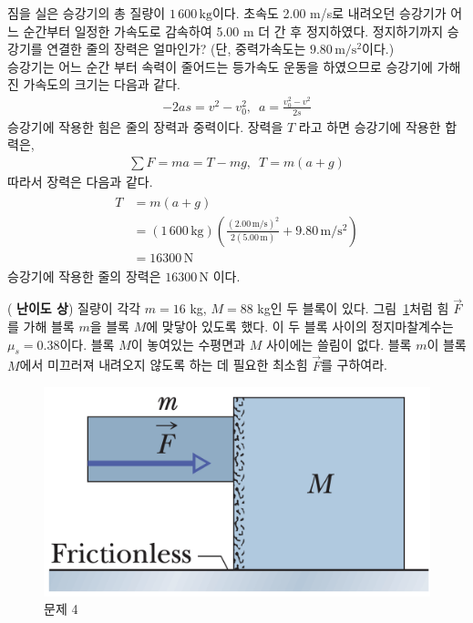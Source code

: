 \documentclass[floatfix,nofootinbib,superscriptaddress,fleqn,preprint]{revtex4}
\begin{document}
짐을 실은 승강기의 총 질량이 
$1\,600\,\mathrm{kg}$이다. 초속도 2.00 m/s로 내려오던 승강기가 어느
순간부터 일정한 가속도로 감속하여 5.00 m 더 간 후
정지하였다. 정지하기까지 승강기를 연결한 줄의 장력은 얼마인가? (단,
중력가속도는 $9.80\,\mathrm{m/s^2}$이다.)   \\

승강기는 어느 순간 부터 속력이 줄어드는 등가속도 운동을 하였으므로
 승강기에 가해진 가속도의 크기는 다음과 같다.
\begin{align}
  -2as = v^2-v_0^2,\,\,\, a = \frac{v_0^2-v^2}{2s}
\end{align}
승강기에 작용한 힘은 줄의 장력과 중력이다. 장력을 $T$ 라고 하면
 승강기에 작용한 합력은,
\begin{align}
  \sum F = ma = T-mg,\,\,\, T = m(a+g)
\end{align}
따라서 장력은 다음과 같다.
\begin{align}
  \begin{split}
    T  &= m(a+g)  \\ 
    &= (1\,600\,\mathrm{kg})\left(\frac{(2.00\,\mathrm{m/s})^2}
    {2(5.00\,\mathrm{m})}+9.80\,\mathrm{m/s^2}\right) \\
    &=16300\,\mathrm{N}
  \end{split}
\end{align}
승강기에 작용한 줄의 장력은 $16300\,\mathrm{N}$ 이다.

\vspace{2cm}

 (\textbf{\color{red} 난이도 상})
질량이 각각 $m=16$ kg, $M=88$ kg인 두 블록이 
있다. 그림~\ref{fig:4}처럼 힘 $\vec{F}$를 가해 블록 $m$을 블록 $M$에
맞닿아 있도록 했다. 이 두 블록 사이의 정지마찰계수는
$\mu_s=0.38$이다. 블록 $M$이 놓여있는 수평면과 $M$ 사이에는 쓸림이
없다.  블록 $m$이 블록 $M$에서 미끄러져 내려오지 않도록 하는 데 필요한
최소힘 $\vec{F}$를 구하여라. 
\begin{figure}[ht]
  \centering
\includegraphics[scale=0.3]{Qfig6-4-20220321.png}  
  \caption{문제 4}
  \label{fig:4}
\end{figure}\\
\end{document}

